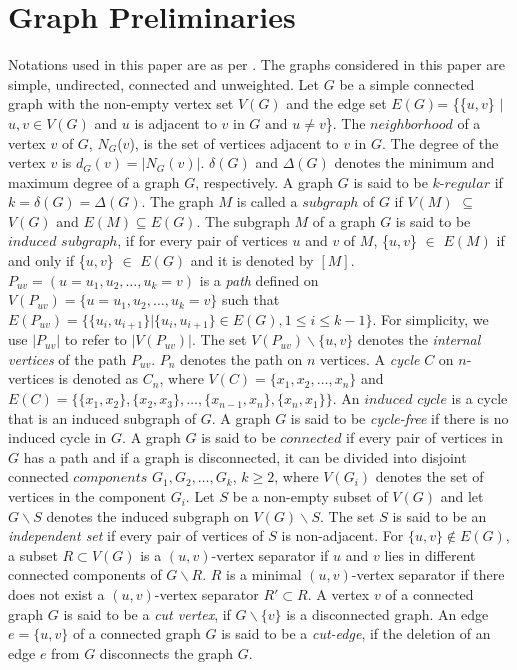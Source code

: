 \documentclass[runningheads]{llncs}
\begin{document}
\section{Graph Preliminaries}

Notations used in this paper are as per \cite{golumbicbook,dbwest}. The graphs considered in this paper are simple, undirected, connected and unweighted. Let $G$ be a simple connected graph with the non-empty vertex set $V(G)$ and the edge set $E(G)$= \{\{$u,v$\} $\vert$ $u,v \in V(G)$ and $u$ is adjacent to $v$ in $G$ and $u \neq v$\}. The $neighborhood$ of a vertex $v$ of $G$, $N_G$($v$), is the set of vertices adjacent to $v$ in $G$. The degree of the vertex $v$ is $d_G(v) = \vert N_G(v) \vert$. $\delta(G)$ and $\Delta (G)$ denotes the minimum and maximum degree of a graph $G$, respectively. A graph $G$ is said to be $k$-$regular$ if $k = \delta (G) = \Delta (G)$. The graph $M$ is called a $subgraph$ of $G$ if $V(M)$ $\subseteq$ $V(G)$ and $E(M)\subseteq E(G)$. The subgraph $M$ of a graph $G$ is said to be $induced$ $subgraph$, if for every pair of vertices $u$ and $v$ of $M$, \{$u,v$\} $\in$ $E(M)$ if and only if \{$u,v$\} $\in$ $E(G)$ and it is denoted by $[M]$. $P_{uv} = (u=u_1, u_2, \ldots, u_k=v)$ is a \emph{path} defined on $V(P_{uv})=\{u=u_1, u_2, \ldots, u_k=v\}$ such that $E(P_{uv}) = \{\{u_i, u_{i+1}\}\vert \{u_i, u_{i+1}\} \in E(G), 1 \leq i \leq k-1\}$. For simplicity, we use $\vert P_{uv} \vert$ to refer to  $\vert V(P_{uv}) \vert$. The set $V(P_{uv})\backslash \{u,v\}$ denotes the \emph{internal vertices} of the path $P_{uv}$. $P_n$ denotes the path on $n$ vertices. A \emph{cycle} $C$ on $n$-vertices is denoted as $C_n$, where $V(C) = \{x_1, x_2, \ldots, x_n\}$ and $E(C) = \{\{x_1, x_2\}, \{x_2,x_3\}, \ldots, \{x_{n-1},x_n\}, \{x_n,x_1\}\}$. An $induced$ $cycle$ is a cycle that is an induced subgraph of $G$. A graph $G$ is said to be \emph{cycle-free} if there is no induced cycle in $G$. A graph $G$ is said to be $connected$ if every pair of vertices in $G$ has a path and if a graph is disconnected, it can be divided into disjoint connected $components$ $G_1, G_2, \ldots, G_k$, $k \geq 2$, where $V(G_i)$ denotes the set of vertices in the component $G_i$. Let $S$ be a non-empty subset of $V(G)$ and let $G\backslash S$ denotes the induced subgraph on $V(G)\backslash S$. The set $S$ is said to be an \emph{independent set} if every pair of vertices of $S$ is non-adjacent. For $\{u,v\} \notin E(G)$, a subset $R \subset V(G)$ is a $(u,v)$-vertex separator if $u$ and $v$ lies in different connected components of $G\backslash R$. $R$ is a minimal $(u,v)$-vertex separator if there does not exist a $(u,v)$-vertex separator $R'\subset R$. A vertex $v$ of a connected graph $G$ is said to be a \emph{cut vertex}, if $G\backslash \{v\}$ is a disconnected graph. An edge $e = \{u,v\}$ of a connected graph $G$ is said to be a \emph{cut-edge}, if the deletion of an edge $e$ from $G$ disconnects the graph $G$. 
\end{document}
